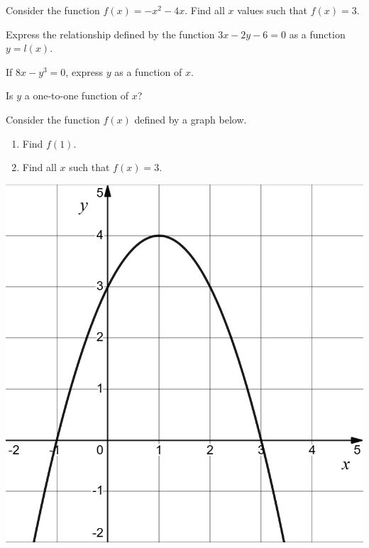\begin{exercise}
  Consider the function $f(x)=-x^2-4x$. Find all $x$ values such that $f(x)=3$.
\end{exercise}

\newpage

\begin{exercise}
  Express the relationship defined by the function $3x-2y-6=0$ as a function $y=l(x)$.
\end{exercise}

\begin{exercise}
  If \(8x-y^3=0\), express \(y\) as a function of \(x\).

  Is $y$ a one-to-one function of $x$?
\end{exercise}


\begin{exercise}
  Consider the function $f(x)$ defined by a graph below.

  \begin{multicols}{2}
    \begin{enumerate}
      \item Find $f(1)$. 
      \item Find all $x$ such that $f(x)=3$.
    \end{enumerate}
    \vfill\mbox{}

    \columnbreak
    
    \begin{center}
      \includegraphics[scale=0.3]{figs/f(x)=-x^2+2x+2.png}
    \end{center}
  \end{multicols}
\end{exercise}
\vspace{-10\baselineskip}


